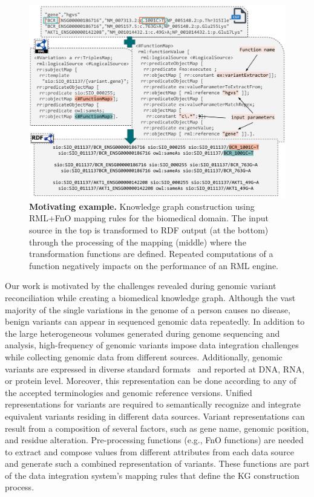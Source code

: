 \begin{figure}[t!]
\centering
\includegraphics[width=\textwidth]{figures/motivating_example.png}
\caption[FunMap motivating example]{\textbf{Motivating example.} Knowledge graph construction using RML+FnO mapping rules for the biomedical domain. The input source in the top is transformed to RDF output (at the bottom) through the processing of the mapping (middle) where the transformation functions are defined. Repeated computations of a function negatively impacts on the performance of an RML engine.} 
\label{fig:motivatingExampleFunMap}
\end{figure}

Our work is motivated by the challenges revealed during genomic variant reconciliation while creating a biomedical knowledge graph. 
Although the vast majority of the single variations in the genome of a person causes no disease, benign variants can appear in sequenced genomic data repeatedly. In addition to the large heterogeneous volumes generated during genome sequencing and analysis, high-frequency of genomic variants impose data integration challenges while collecting genomic data from different sources. 
Additionally, genomic variants are expressed in diverse standard formats~\citep{den2016hgvs} and reported at DNA, RNA, or protein level. Moreover, this representation can be done according to any of the accepted terminologies and genomic reference versions. Unified representations for variants are required
to semantically recognize and integrate equivalent variants residing in different data sources. Variant representations can result from a composition of several factors, such as gene name, genomic position, and residue alteration. 
Pre-processing functions (e.g., FnO functions) are needed to extract and compose values from different attributes from each data source and generate such a combined representation of variants.
These functions are part of the data integration system's mapping rules that define the KG construction process. 


